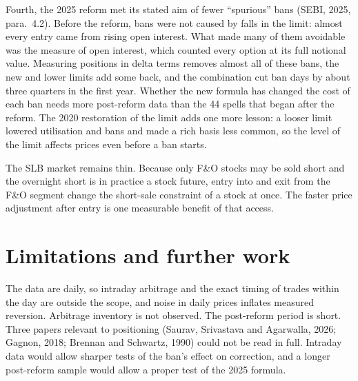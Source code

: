 Fourth, the 2025 reform met its stated aim of fewer ``spurious'' bans (SEBI, 2025, para.\ 4.2). Before the reform, bans
were not caused by falls in the limit: almost every entry came from rising open interest. What made many of them avoidable
was the measure of open interest, which counted every option at its full notional value. Measuring positions in delta terms
removes almost all of these bans, the new and lower limits add some back, and the combination cut ban days by about three
quarters in the first year. Whether the new formula has changed the cost of each ban needs more post-reform data than the
44 spells that began after the reform. The 2020 restoration of the limit adds one more lesson: a looser limit lowered
utilisation and bans and made a rich basis less common, so the level of the limit affects prices even before a ban starts.

The SLB market remains thin. Because only F\&O stocks may be sold short and the overnight short is in practice a stock
future, entry into and exit from the F\&O segment change the short-sale constraint of a stock at once. The faster price
adjustment after entry is one measurable benefit of that access.

\section{Limitations and further work}
The data are daily, so intraday arbitrage and the exact timing of trades within the day are outside the scope, and noise
in daily prices inflates measured reversion. Arbitrage inventory is not observed. The post-reform period is short. Three
papers relevant to positioning (Saurav, Srivastava and Agarwalla, 2026; Gagnon, 2018; Brennan and Schwartz, 1990) could
not be read in full. Intraday data would allow sharper tests of the ban's effect on correction, and a longer post-reform
sample would allow a proper test of the 2025 formula.
